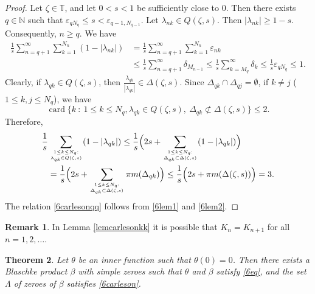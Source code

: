 \documentclass[a4paper,oneside,11pt]{amsart}
\numberwithin{equation}{section}
\theoremstyle{plain}
\newtheorem{theorem}{Theorem}[section]
\theoremstyle{definition}
\newtheorem{remark}[theorem]{Remark}
\begin{document}
\begin{proof}
Let $\zeta\in\mathbb T$, and let  $0<s<1$ be sufficiently close to $0$. Then there exists  $q\in\mathbb N$ such that 
$\varepsilon_{qN_q}\leq s <\varepsilon_{q-1, N_{q-1}}$. 
 Let $\lambda_{nk}\in Q(\zeta, s)$. Then $|\lambda_{nk}|\geq 1-s$. 
Consequently, $n\geq q$. We have \begin{equation}
\begin{aligned}\label{6lem1}\frac{1}{s}\sum_{n= q+1}^\infty \sum_{k=1}^{N_n} (1-|\lambda_{nk}|)&=
\frac{1}{s}\sum_{n= q+1}^\infty \sum_{k=1}^{N_n} \varepsilon_{nk}\\&
\leq\frac{1}{s}\sum_{n= q+1}^\infty \delta_{M_{n-1}}
\leq\frac{1}{s}\sum_{k=M_q}^\infty \delta_k\leq\frac{1}{s} \varepsilon_{qN_q}\leq 1.
\end{aligned}\end{equation}
Clearly, if $\lambda_{qk}\in Q(\zeta, s)$, then $\frac{\lambda_{qk}}{|\lambda_{qk}|}\in \Delta(\zeta, s)$. 
Since $\Delta_{qk}\cap\Delta_{qj}=\emptyset$, if $k\neq j$ ($1\leq k,j\leq N_q$), we have 
\begin{equation*} \operatorname{card}\{k\ : \ 1\leq k\leq N_q, \lambda_{qk}\in Q(\zeta, s), \ \Delta_{qk}\not\subset \Delta(\zeta, s)\}\leq 2.
\end{equation*}
Therefore, \begin{equation}
\begin{aligned}\label{6lem2}\frac{1}{s} &\sum_{1\leq k\leq N_q: \atop \lambda_{qk}\in Q(\zeta, s)} (1-|\lambda_{qk}|) 
\leq
\frac{1}{s}\Bigl(2s + \sum_{1\leq k\leq N_q: \atop \Delta_{qk}\subset  \Delta(\zeta, s)} (1-|\lambda_{qk}|)\Bigr)\\&
=
\frac{1}{s}\Bigl(2s + \sum_{1\leq k\leq N_q: \atop \Delta_{qk}\subset  \Delta(\zeta, s)} \pi m(\Delta_{qk})\Bigr)\leq 
\frac{1}{s}\Bigl(2s +  \pi m(\Delta(\zeta, s))\Bigr)=3.
\end{aligned}\end{equation}
The relation  \eqref{6carlesonqq} follows from \eqref{6lem1} and \eqref{6lem2}.
\end{proof}

\begin{remark} In Lemma \ref{lemcarlesonkk} it is possible that $K_n=K_{n+1}$ for all $n=1,2, \ldots$.\end{remark}

\begin{theorem}\label{thm6main} Let $\theta$ be an inner function such that $\theta(0)=0$. Then there exists 
a Blaschke product $\beta$ with simple zeroes such that $\theta$ and $\beta$ satisfy \eqref{6eq}, and the set $\Lambda$ of zeroes of $\beta$   
satisfies \eqref{6carleson}.
\end{theorem}
\end{document}
